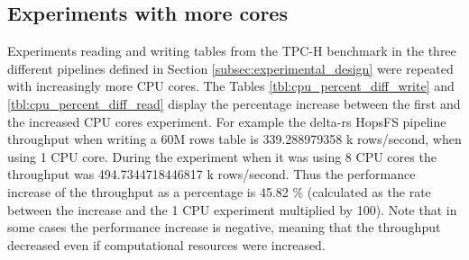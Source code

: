 \subsection{Experiments with more  cores}

Experiments reading and writing tables from the TPC-H benchmark in the three different pipelines defined in Section \ref{subsec:experimental_design} were repeated with increasingly more \gls{CPU} cores. The Tables \ref{tbl:cpu_percent_diff_write} and \ref{tbl:cpu_percent_diff_read} display the percentage increase between the first and the increased \gls{CPU} cores experiment. For example the delta-rs \gls{HopsFS} pipeline throughput when writing a 60M rows table is 339.288979358 k rows/second, when using 1 \gls{CPU} core. During the experiment when it was using 8 \gls{CPU} cores the throughput was 494.7344718446817 k rows/second. Thus the performance increase of the throughput as a percentage is 45.82 \% (calculated as the rate between the increase and the 1 \gls{CPU} experiment multiplied by 100). Note that in some cases the performance increase is negative, meaning that the throughput decreased even if computational resources were increased.


